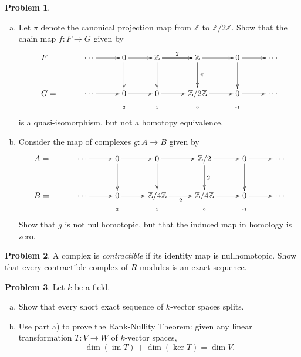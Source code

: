 \documentclass[11pt]{article}
\DeclareMathOperator{\im}{im}
\newcommand{\Z}{\mathbb{Z}}
\theoremstyle{definition}
\newtheorem{problem}{Problem}
\begin{document}
\begin{problem}$\,$
\begin{enumerate}[a)]
	\item Let $\pi$ denote the canonical projection map from $\Z$ to $\Z/2\Z$. Show that the chain map $f\!: F \longrightarrow G$ given by
$$\xymatrix@R=1mm@C=10mm{F = & \cdots \ar[r] & 0 \ar[r] \ar[dddd] & \Z \ar[r]^-2 \ar[dddd] \ar[r] & \Z \ar[dddd]^-{\pi} \ar[r] & 0 \ar[dddd] \ar[r] & \cdots \\
	&&&&\\ 
	&&&&\\ 
	&&&&\\ 
	G = &\cdots \ar[r] & 0 \ar[r] & 0 \ar[r] & \Z/2\Z \ar[r] & 0 \ar[r] & \cdots \\
	&& \textrm{\tiny 2} & \textrm{\tiny 1} & \textrm{\tiny 0} &\textrm{\tiny -1}}$$
is a quasi-isomorphism, but not a homotopy equivalence.
	
\item Consider the map of complexes $g\!: A \to B$ given by
$$\xymatrix@R=1mm@C=10mm{A = & \cdots \ar[r] & 0 \ar[r] \ar[dddd] & 0 \ar[r] \ar[dddd] \ar[r] & \Z/2 \ar[dddd]^-{2} \ar[r] & 0 \ar[dddd] \ar[r] & \cdots \\ 
	&&&&\\ 
	&&&&\\ 
	&&&&\\ 
	B = & \cdots \ar[r] & 0 \ar[r] & \Z/4\Z \ar[r]_-2 & \Z/4\Z \ar[r] & 0 \ar[r] & \cdots \\
	&& \textrm{\tiny 2} & \textrm{\tiny 1} & \textrm{\tiny 0} &\textrm{\tiny -1}}$$
Show that $g$ is not nullhomotopic, but that the induced map in homology is zero.
\end{enumerate}
\end{problem}

\vfill

\begin{problem}
	A complex is \emph{contractible} if its identity map is nullhomotopic. Show that every contractible complex of $R$-modules is an exact sequence.
\end{problem}

\newpage

\begin{problem}
	Let $k$ be a field. 
\begin{enumerate}[a)]
	\item Show that every short exact sequence of $k$-vector spaces splits.	
	\item Use part a) to prove the Rank-Nullity Theorem: given any linear transformation $T\!: V \to W$ of $k$-vector spaces, 
	$$\dim(\im T) + \dim(\ker T) = \dim V.$$
\end{enumerate}
\end{problem}
\end{document}
